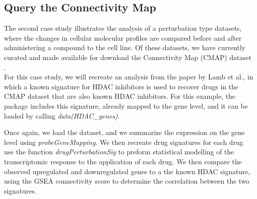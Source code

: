 \documentclass[11pt]{article}
\begin{document}
\subsection{Query the Connectivity Map}

The second case study illustrates the analysis of a perturbation type datasets, where the changes in cellular molecular profiles are compared before and after administering a compound to the cell line. Of these datasets, we have currently curated and made available for download the Connectivity Map (CMAP) dataset \cite{Lamb:2006hf}. \\

For this case study, we will recreate an analysis from the paper by Lamb et al., in which a known signature for HDAC inhibitors \cite{Glaser:2003gk} is used to recover drugs in the CMAP dataset that are also known HDAC inhibitors. For this example, the package includes this signature, already mapped to the gene level, and it can be loaded by calling \textit{data(HDAC\_genes)}.

Once again, we load the dataset, and we summarize the expression on the gene level using \textit{probeGeneMapping}. We then recreate drug signatures for each drug use the function \textit{drugPerturbationSig} to preform statistical modelling of the transcriptomic response to the application of each drug. We then compare the observed upregulated and downregulated genes to a the known HDAC signature, using the GSEA connectivity score to determine the correlation between the two signatures. 
\end{document}
